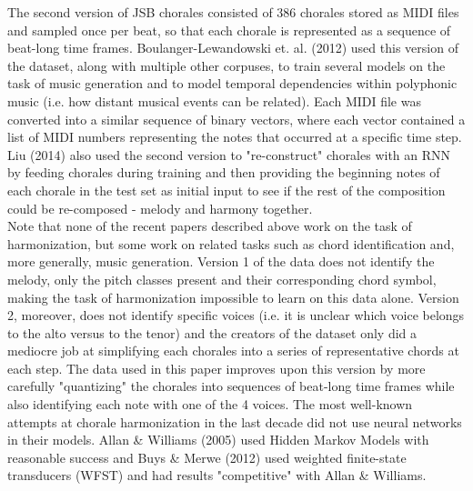 \documentclass[12pt]{article}
\begin{document}
The second version of JSB chorales consisted of 386 chorales stored as MIDI files and sampled once per beat, so that each chorale is represented as a sequence of beat-long time frames. Boulanger-Lewandowski et. al. (2012) used this version of the dataset, along with multiple other corpuses, to train several models on the task of music generation and to model temporal dependencies within polyphonic music (i.e. how distant musical events can be related). Each MIDI file was converted into a similar sequence of binary vectors, where each vector contained a list of MIDI numbers representing the notes that occurred at a specific time step. Liu (2014) also used the second version to "re-construct" chorales with an RNN by feeding chorales during training and then providing the beginning notes of each chorale in the test set as initial input to see if the rest of the composition could be re-composed - melody and harmony together.\\

Note that none of the recent papers described above work on the task of harmonization, but some work on related tasks such as chord identification and, more generally, music generation. Version 1 of the data does not identify the melody, only the pitch classes present and their corresponding chord symbol, making the task of harmonization impossible to learn on this data alone. Version 2, moreover, does not identify specific voices (i.e. it is unclear which voice belongs to the alto versus to the tenor) and the creators of the dataset only did a mediocre job at simplifying each chorales into a series of representative chords at each step. The data used in this paper improves upon this version by more carefully "quantizing" the chorales into sequences of beat-long time frames while also identifying each note with one of the 4 voices. The most well-known attempts at chorale harmonization in the last decade did not use neural networks in their models. Allan \& Williams (2005) used Hidden Markov Models with reasonable success and Buys \& Merwe (2012) used weighted finite-state transducers (WFST) and had results "competitive" with Allan \& Williams.  \\ 
\end{document}
